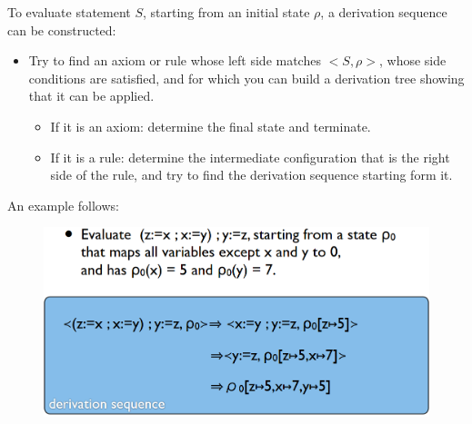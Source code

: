 \documentclass[10pt,a4paper]{report}
\begin{document}
To evaluate statement $S$, starting from an initial state $\rho$, a derivation sequence can be constructed:
\begin{itemize}
\item Try to find an axiom or rule whose left side matches $<S, \rho>$, whose side conditions are satisfied, and for which you can build a derivation tree showing that it can be applied.
\begin{itemize}
\item If it is an axiom: determine the final state and terminate.
\item If it is a rule: determine the intermediate configuration that is the right side of the rule, and try to find the derivation sequence starting form it.
\end{itemize}
\end{itemize}
An example follows:
\begin{figure}[H]
\centering
\includegraphics[scale=0.4]{26.png}
\end{figure}
\end{document}
